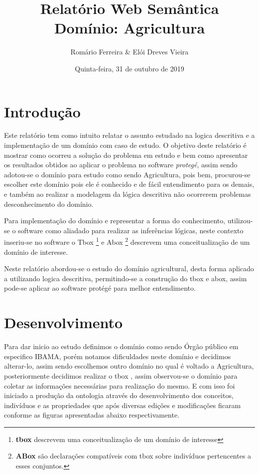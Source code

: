\documentclass{article}
\title{Relatório Web Semântica \\ \textbf{Domínio}: Agricultura}
\author{Romário Ferreira \& Elói Dreves Vieira}
\date{Quinta-feira, 31 de outubro de 2019}
\begin{document}
\maketitle

\section{Introdução}
Este relatório tem como intuito relatar o assunto estudado na logica descritiva e a implementação 
de um domínio com caso de estudo. O objetivo deste relatório é mostrar como ocorreu a solução do problema em estudo e bem como apresentar os resultados obtidos ao aplicar o problema no software 
\textit{protegé}, assim sendo adotou-se o domínio para estudo como sendo Agricultura, pois bem, procurou-se escolher este domínio pois ele é conhecido e de fácil entendimento para os demais, e também ao realizar a modelagem da lógica descritiva não ocorrerem problemas desconhecimento do domínio.

Para implementação do domínio e representar a forma do conhecimento, utilizou-se o software como aliadado para realizar as inferências lógicas, neste contexto inseriu-se no software o Tbox 
\footnote{\textbf{tbox} descrevem uma conceitualização de um domínio de interesse}
e Abox \footnote{\textbf{ABox} são declarações compatíveis com tbox sobre indivíduos pertencentes a esses conjuntos.} descrevem uma conceitualização de um domínio de interesse.

Neste relatório abordou-se o estudo do domínio agricultural, desta forma aplicado a utilizando logica descritiva, permitindo-se a construção do tbox e abox, assim pode-se aplicar ao software protégé para melhor entendimento.


\section{Desenvolvimento}
    Para dar inicio ao estudo definimos o domínio como sendo Órgão público em especifico IBAMA, porém notamos dificuldades neste domínio e decidimos alterar-lo, assim sendo escolhemos outro domínio
    no qual é voltado a Agricultura, posteriormente decidimos realizar o tbox , assim observou-se o 
    domínio para coletar as informações necessárias para realização do mesmo.
    E com isso foi iniciado a produção da ontologia através do desenvolvimento dos conceitos, indivíduos e as propriedades que após diversas edições e modificações ficaram conforme as figuras apresentadas abaixo respectivamente.
    
\end{document}
